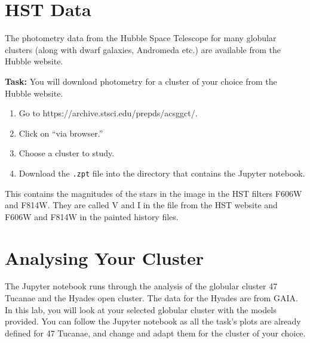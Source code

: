 \documentclass{article}
\begin{document}
\section{HST Data}

The photometry data from the Hubble Space Telescope for many globular clusters (along with dwarf galaxies, Andromeda etc.) are available from the Hubble website.

\textbf{Task:}
You will download photometry for a cluster of your choice from the Hubble website.
\begin{enumerate}
 \setlength\itemsep{0em}
\item Go to https://archive.stsci.edu/prepds/acsggct/.  
\item Click on ``via browser.''
\item Choose a cluster to study.
\item Download the \texttt{.zpt} file into the directory that contains the Jupyter notebook.  
\end{enumerate}
This contains the magnitudes of the stars in the image in the HST filters F606W and F814W.  They are called V and I in the file from the HST website and F606W and F814W in the painted history files.

\section{Analysing Your Cluster}

The Jupyter notebook runs through the analysis of the globular cluster 47 Tucanae and the Hyades open cluster.  The data for the Hyades are from GAIA.  In this lab, you will look at your selected globular cluster with the models provided. You can follow the Jupyter notebook as all the task's plots are already defined for 47 Tucanae, and change and adapt them for the cluster of your choice.
\end{document}
